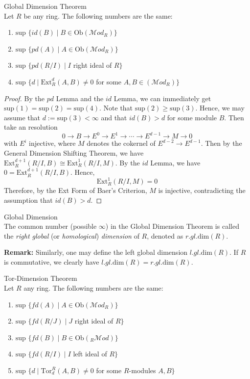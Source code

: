 \begin{theorem}{Global Dimension Theorem}\\
Let $R$ be any ring. The following numbers are the same:
\begin{enumerate}
    \item $\text{sup } \{ id (B)\mid B\in \text{Ob}(\mathcal{M}od_R) \}$
    \item $\text{sup } \{pd (A) \mid A\in \text{Ob} (\mathcal{M}od_R) \}$
    \item $\text{sup } \{ pd (R/I) \mid I$ right ideal of $R\}$
    \item $\text{sup } \{d \mid \text{Ext}_R^d (A,B)\neq 0$ for some $A,B\in (\mathcal{M}od_R)\}$
\end{enumerate}
\end{theorem}

\begin{proof}
    By the $pd$ Lemma and the $id$ Lemma, we can immediately get $\text{sup}(1)= \text{sup} (2)= \text{sup} (4)$. Note that $\text{sup}(2) \geq \text{sup} (3)$. Hence, we may assume that $d:= \text{sup} (3)<\infty$ and that $id(B)>d$ for some module $B$. Then take an resolution
    \[
    0\to B\to E^0 \to E^1\to \cdots \to E^{d-1} \to M\to0
    \]
    with $E^i$ injective, where $M$ denotes the cokernel of $E^{d-2}\to E^{d-1}$. Then by the General Dimension Shifting Theorem, we have $\text{Ext}_R^{d+1} (R/I,B) \cong \text{Ext}_R^1 (R/I,M)$. By the $id$ Lemma, we have $0= \text{Ext}_R^{d+1} (R/I,B)$. Hence, 
    \[
    \text{Ext}_R^1 (R/I,M)=0
    \]
    Therefore, by the Ext Form of Baer's Criterion, $M$ is injective, contradicting the assumption that $id(B)>d$.
\end{proof}

\begin{definition}{Global Dimension}\\
The common number (possible $\infty$) in the Global Dimension Theorem is called the \textit{right global} (or \textit{homological}) \textit{dimension} of $R$, denoted as $r.gl.\text{dim} (R)$.
\end{definition}

\noindent\textbf{Remark:} Similarly, one may define the left global dimension $l.gl.\text{dim} (R)$. If $R$ is commutative, we clearly have $l.gl.\text{dim} (R)= r.gl. \text{dim} (R)$.

\begin{theorem}{Tor-Dimension Theorem}\\
Let $R$ any ring. The following numbers are the same:
\begin{enumerate}
    \item $\text{sup } \{fd(A) \mid A\in \text{Ob} (\mathcal{M}od_R) \}$
    \item $\text{sup } \{fd(R/J) \mid J$ right ideal of $R\}$
    \item $\text{sup } \{ fd(B) \mid B\in \text{Ob} (_R\mathcal{M}od)\}$
    \item $\text{sup } \{ fd(R/I) \mid I$ left ideal of $R\}$
    \item $\text{sup } \{d\mid \text{Tor}_d^R(A,B)\neq 0$ for some $R$-modules $A,B\}$
\end{enumerate}
\end{theorem}

